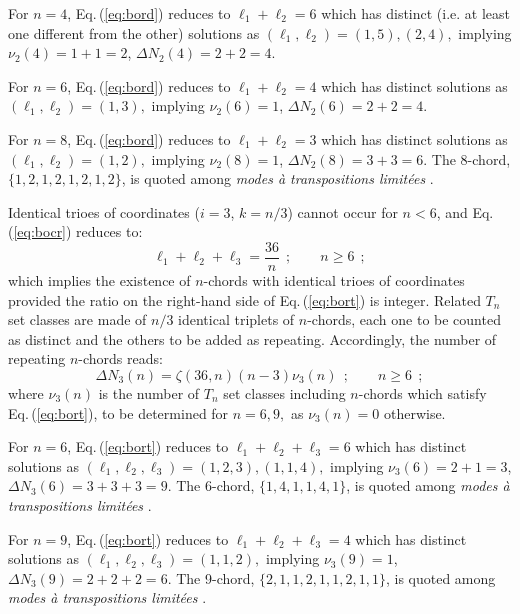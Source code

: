 \documentclass[12pt,a4paper]{article}
\begin{document}
For $n=4$, Eq.\,(\ref{eq:bord}) reduces to $\ell_1+\ell_2=6$ which has
distinct (i.e. at least one different from the other) solutions as
$(\ell_1,\ell_2)=(1,5),(2,4),$ implying $\nu_2(4)=1+1=2$,
$\Delta N_2(4)=2+2=4$.

For $n=6$, Eq.\,(\ref{eq:bord}) reduces to $\ell_1+\ell_2=4$ which has
distinct
solutions as $(\ell_1,\ell_2)=(1,3),$ implying
$\nu_2(6)=1$, $\Delta N_2(6)=2+2=4$.

For $n=8$, Eq.\,(\ref{eq:bord}) reduces to $\ell_1+\ell_2=3$ which has
distinct solutions as $(\ell_1,\ell_2)=(1,2),$ implying $\nu_2(8)=1$,
$\Delta N_2(8)=3+3=6$.   The 8-chord, $\{1,2,1,2,1,2,1,2\}$, is quoted among
{\it modes \`a transpositions limit\'ees} \cite{Mes44}.

Identical trioes of coordinates  ($i=3$, $k=n/3$) cannot occur for $n<6$, and
Eq.\,(\ref{eq:bocr}) reduces to:
\begin{equation}
\label{eq:bort}
\ell_1+\ell_2+\ell_3=\frac{36}n~~;\qquad n\ge6~~;
\end{equation}
which implies the existence of $n$-chords with identical trioes of coordinates
provided the ratio on the right-hand side of Eq.\,(\ref{eq:bort}) is integer.
Related $T_n$ set classes are made of $n/3$ identical triplets of $n$-chords,
each one to be counted as
distinct and the others to be added as repeating.   Accordingly,
the number of repeating $n$-chords reads:
\begin{equation}
\label{eq:DeN3}
\Delta N_3(n)=\zeta(36,n)(n-3)\nu_3(n)~~;\qquad n\ge6~~;
\end{equation}
where $\nu_3(n)$ is the number of $T_n$ set classes including $n$-chords which
satisfy Eq.\,(\ref{eq:bort}), to be determined for $n=6,9,$ as $\nu_3(n)=0$
otherwise.

For $n=6$, Eq.\,(\ref{eq:bort}) reduces to $\ell_1+\ell_2+\ell_3=6$ which has
distinct solutions as $(\ell_1,\ell_2,\ell_3)=(1,2,3),(1,1,4),$ implying
$\nu_3(6)=2+1=3$, $\Delta N_3(6)=3+3+3=9$.
The 6-chord, $\{1,4,1,1,4,1\}$, is quoted among {\it modes \`a
transpositions limit\'ees} \cite{Mes44}.

For $n=9$, Eq.\,(\ref{eq:bort}) reduces to $\ell_1+\ell_2+\ell_3=4$ which has
distinct solutions as $(\ell_1,\ell_2,\ell_3)=(1,1,2),$ implying
$\nu_3(9)=1$, $\Delta N_3(9)=2+2+2=6$.
The 9-chord, $\{2,1,1,2,1,1,2,1,1\}$, is quoted among {\it modes \`a
transpositions limit\'ees} \cite{Mes44}.
\end{document}
